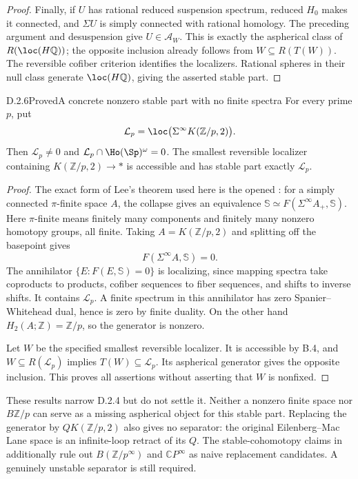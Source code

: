 \begin{proof}
Finally, if $U$ has rational reduced suspension spectrum, reduced
$H_0$ makes it connected, and $\Sigma U$ is simply connected with
rational homology. The preceding argument and desuspension give
$U\in\mathcal A_W$. This is exactly the aspherical class of
$R(\loc(H\mathbb Q))$; the opposite inclusion already follows from
$W\subseteq R(T(W))$. The reversible cofiber criterion identifies
the localizers. Rational spheres in their null class generate
$\loc(H\mathbb Q)$, giving the asserted stable part.
\end{proof}

\begin{claim}{D.2.6}{Proved}{A concrete nonzero stable part with no finite spectra}
For every prime $p$, put
\[
 \mathcal L_p=\loc\bigl(\Sigma^\infty K(\mathbb Z/p,2)\bigr).
\]
Then $\mathcal L_p\ne0$ and
$\mathcal L_p\cap\Ho(\Sp)^\omega=0$.
The smallest reversible localizer containing
$K(\mathbb Z/p,2)\to *$ is accessible and has stable part
exactly $\mathcal L_p$.
\end{claim}
\begin{proof}
The exact form of Lee's theorem used here is the opened
\cite[Corollary~1.4.1]{JYuan2024}: for a simply connected $\pi$-finite
space $A$, the collapse gives an equivalence
$\mathbb S\simeq F(\Sigma^\infty A_+,\mathbb S)$.
Here $\pi$-finite means finitely many components and finitely many
nonzero homotopy groups, all finite. Taking $A=K(\mathbb Z/p,2)$
and splitting off the basepoint gives
\[
                  F(\Sigma^\infty A,\mathbb S)=0.
\]
The annihilator $\{E:F(E,\mathbb S)=0\}$ is localizing, since
mapping spectra take coproducts to products, cofiber sequences to
fiber sequences, and shifts to inverse shifts. It contains
$\mathcal L_p$. A finite spectrum in this annihilator has zero
Spanier--Whitehead dual, hence is zero by finite duality.
On the other hand $H_2(A;\mathbb Z)=\mathbb Z/p$, so the generator
is nonzero.

Let $W$ be the specified smallest reversible localizer. It is
accessible by B.4, and $W\subseteq R(\mathcal L_p)$ implies
$T(W)\subseteq\mathcal L_p$. Its aspherical generator gives the
opposite inclusion. This proves all assertions without asserting
that $W$ is nonfixed.
\end{proof}

These results narrow D.2.4 but do not settle it. Neither a nonzero
finite space nor $B\mathbb Z/p$ can serve as a missing aspherical
object for this stable part. Replacing the generator by
$QK(\mathbb Z/p,2)$ also gives no separator: the original
Eilenberg--Mac Lane space is an infinite-loop retract of its $Q$.
The stable-cohomotopy claims in
\cite[Section~10.12 and Lemma~10.13]{EH5Bousfield1997} additionally
rule out $B(\mathbb Z/p^\infty)$ and $\mathbb CP^\infty$ as naive
replacement candidates. A genuinely unstable separator is still
required.
